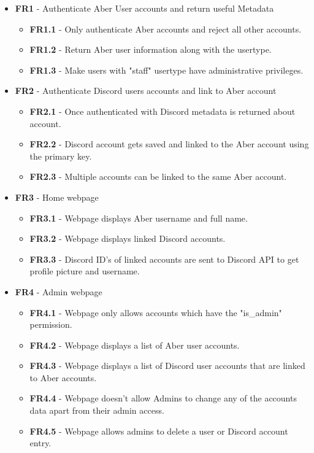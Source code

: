 \begin{itemize}
	\item \textbf{FR1} - Authenticate Aber User accounts and return useful Metadata
	\begin{itemize}
		\item \textbf{FR1.1} - Only authenticate Aber accounts and reject all other accounts.
		\item \textbf{FR1.2} - Return Aber user information along with the usertype.
		\item \textbf{FR1.3} - Make users with "staff" usertype have administrative privileges.
	\end{itemize}

	\item \textbf{FR2} - Authenticate Discord users accounts and link to Aber account
	\begin{itemize}
		\item \textbf{FR2.1} - Once authenticated with Discord metadata is returned about account.
		\item \textbf{FR2.2} - Discord account gets saved and linked to the Aber account using the primary key.
		\item \textbf{FR2.3} - Multiple accounts can be linked to the same Aber account.
	\end{itemize}

	\item \textbf{FR3} - Home webpage
	\begin{itemize}
		\item \textbf{FR3.1} - Webpage displays Aber username and full name.
		\item \textbf{FR3.2} - Webpage displays linked Discord accounts.
		\item \textbf{FR3.3} - Discord ID's of linked accounts are sent to Discord API to get profile picture and username.
	\end{itemize}

	\item \textbf{FR4} - Admin webpage
	\begin{itemize}
		\item \textbf{FR4.1} - Webpage only allows accounts which have the "is\_admin" permission.
		\item \textbf{FR4.2} - Webpage displays a list of Aber user accounts.
		\item \textbf{FR4.3} - Webpage displays a list of Discord user accounts that are linked to Aber accounts.
		\item \textbf{FR4.4} - Webpage doesn't allow Admins to change any of the accounts data apart from their admin access.
		\item \textbf{FR4.5} - Webpage allows admins to delete a user or Discord account entry.
	\end{itemize}


\end{itemize}
